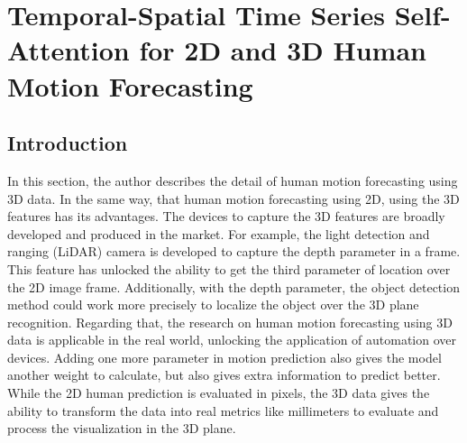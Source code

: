 
\chapter{Temporal-Spatial Time Series Self-Attention for 2D and 3D Human Motion Forecasting}\label{4} %

\section{Introduction}\label{4:intro}
In this section, the author describes the detail of human motion forecasting using 3D data.
In the same way, that human motion forecasting using 2D, using the 3D features has its advantages. The devices to capture the 3D features are broadly developed and produced in the market. For example, the light detection and ranging (LiDAR) camera is developed to capture the depth parameter in a frame. This feature has unlocked the ability to get the third parameter of location over the 2D image frame. Additionally, with the depth parameter, the object detection method could work more precisely to localize the object over the 3D plane recognition. Regarding that, the research on human motion forecasting using 3D data is applicable in the real world, unlocking the application of automation over devices. Adding one more parameter in motion prediction also gives the model another weight to calculate, but also gives extra information to predict better. While the 2D human prediction is evaluated in pixels, the 3D data gives the ability to transform the data into real metrics like millimeters to evaluate and process the visualization in the 3D plane. 

